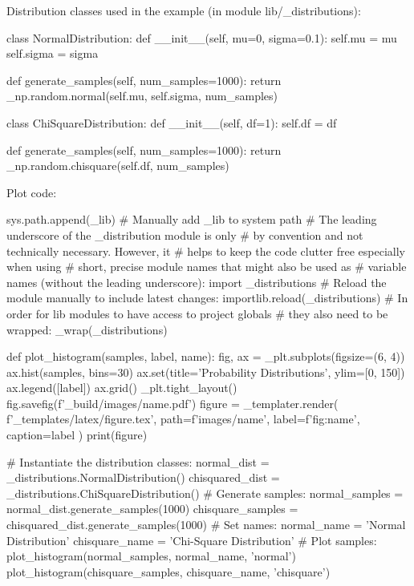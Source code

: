 \documentclass[a4paper]{book}
\begin{document}
Distribution classes used in the example (in module lib/\_distributions):
\begin{python}
class NormalDistribution:
    def __init__(self, mu=0, sigma=0.1):
        self.mu = mu
        self.sigma = sigma
   
    def generate_samples(self, num_samples=1000):
        return _np.random.normal(self.mu, self.sigma, num_samples)

class ChiSquareDistribution:
    def __init__(self, df=1):
        self.df = df

    def generate_samples(self, num_samples=1000):
        return _np.random.chisquare(self.df, num_samples)

\end{python}
Plot code:
\begin{python}
sys.path.append(_lib) # Manually add _lib to system path
# The leading underscore of the _distribution module is only 
# by convention and not technically necessary. However, it 
# helps to keep the code clutter free especially when using 
# short, precise module names that might also be used as 
# variable names (without the leading underscore):
import _distributions
# Reload the module manually to include latest changes: 
importlib.reload(_distributions)
# In order for lib modules to have access to project globals 
# they also need to be wrapped:
_wrap(_distributions)

def plot_histogram(samples, label, name):
    fig, ax = _plt.subplots(figsize=(6, 4))
    ax.hist(samples, bins=30)
    ax.set(title='Probability Distributions', ylim=[0, 150])
    ax.legend([label])
    ax.grid()
    _plt.tight_layout()
    fig.savefig(f'{_build}/images/{name}.pdf')
    figure = _templater.render(
        f'{_templates}/latex/figure.tex',
        path=f'images/{name}',
        label=f'fig:{name}',
        caption=label
    )
    print(figure)

# Instantiate the distribution classes:
normal_dist         = _distributions.NormalDistribution()
chisquared_dist     = _distributions.ChiSquareDistribution()
# Generate samples:
normal_samples      = normal_dist.generate_samples(1000)
chisquare_samples   = chisquared_dist.generate_samples(1000)
# Set names:
normal_name         = 'Normal Distribution'
chisquare_name      = 'Chi-Square Distribution'
# Plot samples:
plot_histogram(normal_samples, normal_name, 'normal')
plot_histogram(chisquare_samples, chisquare_name, 'chisquare')

\end{python}
\printbibliography
\end{document}
